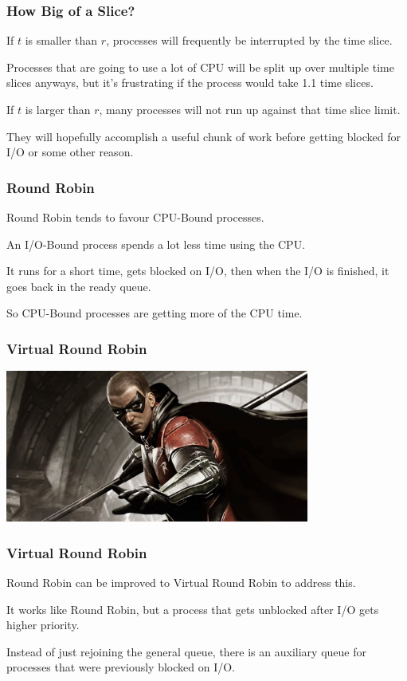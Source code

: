 \begin{frame}
\frametitle{How Big of a Slice?}

If $t$ is smaller than $r$, processes will frequently be interrupted by the time slice. 

Processes that are going to use a lot of CPU will be split up over multiple time slices anyways, but it's frustrating if the process would take 1.1 time slices. 

If $t$ is larger than $r$, many processes will not run up against that time slice limit.

They will hopefully accomplish a useful chunk of work before getting blocked for I/O or some other reason. 

\end{frame}

\begin{frame}
\frametitle{Round Robin}

Round Robin tends to favour CPU-Bound processes. 

An I/O-Bound process spends a lot less time using the CPU. 

It runs for a short time, gets blocked on I/O, then when the I/O is finished, it goes back in the ready queue. 

So CPU-Bound processes are getting more of the CPU time.


\end{frame}


\begin{frame}
\frametitle{Virtual Round Robin}

\begin{center}
	\includegraphics[width=0.75\textwidth]{images/virtualrobin.jpg}
\end{center}

\end{frame}



\begin{frame}
\frametitle{Virtual Round Robin}

Round Robin can be improved to Virtual Round Robin to address this. 

It works like Round Robin, but a process that gets unblocked after I/O gets higher priority.

Instead of just rejoining the general queue, there is an auxiliary queue for processes that were previously blocked on I/O.

\end{frame}

